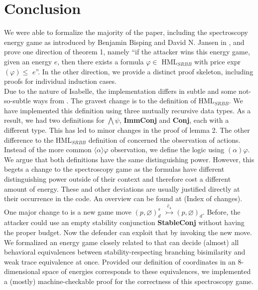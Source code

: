 \section{Conclusion}
We were able to formalize the majority of the paper, including the spectroscopy energy game as introduced by Benjamin Bisping and David N. Jansen in \cite{bisping2023lineartimebranchingtime}, 
and prove one direction of theorem 1, namely ``if the attacker wins this energy game, given an energy $e$, then there exists a formula $\varphi \in$ HML$_{SRBB}$ with price expr$(\varphi) \leq$ $e$''. 
In the other direction, we provide a distinct proof skeleton, including proofs for individual induction cases.
\\
Due to the nature of Isabelle, the implementation differs in subtle and some not-so-subtle ways from \cite{bisping2023lineartimebranchingtime}. The gravest change is to the definition of HML$_{SRBB}$. 
We have implemented this definition using three mutually recursive data types. As a result, we had two definitions for $\bigwedge\psi$, \textbf{ImmConj} and \textbf{Conj}, each with a different type. 
This has led to minor changes in the proof of lemma 2. The other difference to the HML$_{SRBB}$ definition of \cite{bisping2023lineartimebranchingtime} concerned the observation of actions. 
Instead of the more common $\langle \alpha \rangle\varphi$ observation, we define the logic using $(\alpha)\varphi$. We argue that both definitions have the same distinguishing power. However, 
this begets a change to the spectroscopy game as the formulas have different distinguishing power outside of their context and therefore cost a different amount of energy.
These and other deviations are usually justified directly at their occurrence in the code. An overview can be found at (Index of changes). 
\\
One major change to \cite{bisping2023lineartimebranchingtime} is a new game move $(p,\varnothing)_{d}^{s}$ $\overset{\hat{e}_4}{\rightarrowtail} (p,\varnothing)_d$. 
Before, the attacker could use an empty stability conjunction \textbf{StableConj} without having the proper budget. Now the defender can exploit that by invoking the new move.
\\
We formalized an energy game closely related to \cite{bisping2023lineartimebranchingtime} that can decide (almost) all behavioral equivalences between stability-respecting branching bisimilarity and weak trace equivalence at once.
Provided our definition of coordinates in an 8-dimensional space of energies corresponds to these equivalences, we implemented a (mostly) machine-checkable proof for the correctness of this spectroscopy game.